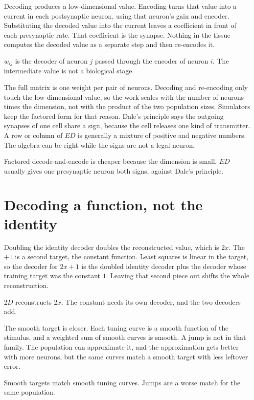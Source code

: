 \documentclass[11pt,letterpaper]{article}
\newcommand{\ans}[1]{\par\vspace{2pt}{\bfseries #1}\quad}
\begin{document}
\ans{1.}
Decoding produces a low-dimensional value. Encoding turns that value into a current in each postsynaptic neuron, using that neuron's gain and encoder. Substituting the decoded value into the current leaves a coefficient in front of each presynaptic rate. That coefficient is the synapse. Nothing in the tissue computes the decoded value as a separate step and then re-encodes it.
\begin{result}
\(w_{ij}\) is the decoder of neuron \(j\) passed through the encoder of neuron \(i\). The intermediate value is not a biological stage.
\end{result}

\ans{2.}
The full matrix is one weight per pair of neurons. Decoding and re-encoding only touch the low-dimensional value, so the work scales with the number of neurons times the dimension, not with the product of the two population sizes. Simulators keep the factored form for that reason. Dale's principle says the outgoing synapses of one cell share a sign, because the cell releases one kind of transmitter. A row or column of \(ED\) is generally a mixture of positive and negative numbers. The algebra can be right while the signs are not a legal neuron.
\begin{result}
Factored decode-and-encode is cheaper because the dimension is small. \(ED\) usually gives one presynaptic neuron both signs, against Dale's principle.
\end{result}

\section{Decoding a function, not the identity}

\ans{1.}
Doubling the identity decoder doubles the reconstructed value, which is \(2x\). The \(+1\) is a second target, the constant function. Least squares is linear in the target, so the decoder for \(2x + 1\) is the doubled identity decoder plus the decoder whose training target was the constant \(1\). Leaving that second piece out shifts the whole reconstruction.
\begin{result}
\(2D\) reconstructs \(2x\). The constant needs its own decoder, and the two decoders add.
\end{result}

\ans{2.}
The smooth target is closer. Each tuning curve is a smooth function of the stimulus, and a weighted sum of smooth curves is smooth. A jump is not in that family. The population can approximate it, and the approximation gets better with more neurons, but the same curves match a smooth target with less leftover error.
\begin{result}
Smooth targets match smooth tuning curves. Jumps are a worse match for the same population.
\end{result}
\end{document}
